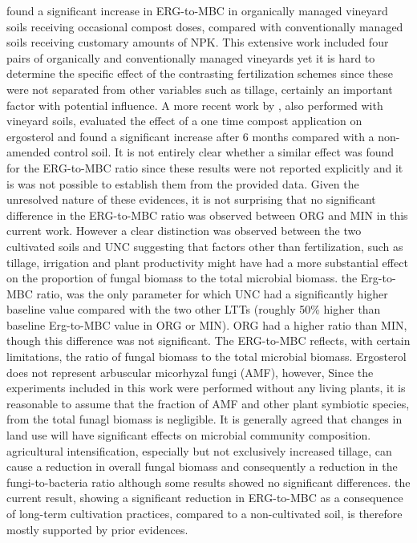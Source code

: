 \documentclass[12pt]{report}
\begin{document}
		\citet{probst2008} found a significant increase in ERG-to-MBC in organically managed vineyard soils receiving occasional compost doses, compared with conventionally managed soils receiving customary amounts of NPK. This extensive work included four pairs of organically and conventionally managed vineyards yet it is hard to determine the specific effect of the contrasting fertilization schemes since these were not separated from other variables such as tillage, certainly an important factor with potential influence. A more recent work by \citet{mackie2015} , also performed with vineyard soils, evaluated the effect of a one time compost application on ergosterol and found a significant increase after 6 months compared with a non-amended control soil. It is not entirely clear whether a similar effect was found for the ERG-to-MBC ratio since these results were not reported explicitly and it is was not possible to establish them from the provided data.
		Given the unresolved nature of these evidences, it is not surprising that no significant difference in the ERG-to-MBC ratio was observed between ORG and MIN in this current work. However a clear distinction was observed between the two cultivated soils and UNC suggesting that factors other than fertilization, such as tillage, irrigation and plant productivity might have had a more substantial effect on the proportion of fungal biomass to the total microbial biomass.
		the Erg-to-MBC ratio, was the only parameter for which UNC had a significantly higher baseline value compared with the two other LTTs (roughly 50\% higher than baseline Erg-to-MBC value in ORG or MIN).
		ORG had a higher ratio than MIN, though this difference was not significant. The ERG-to-MBC reflects, with certain limitations, the ratio of fungal biomass to the total microbial biomass. Ergosterol does not represent arbuscular micorhyzal fungi (AMF), however, Since the experiments included in this work were performed without any living plants, it is reasonable to assume that the fraction of AMF and other plant symbiotic species, from the total funagl biomass is negligible.
		It is generally agreed that changes in land use will have significant effects on microbial community composition\myRed{*}. agricultural intensification, especially but not exclusively increased tillage, can cause a reduction in overall fungal biomass and consequently a reduction in the fungi-to-bacteria ratio\myRed{*} although some results showed no significant differences\myRed{*}.
		the current result, showing a significant reduction in ERG-to-MBC as a consequence of long-term cultivation practices, compared to a non-cultivated soil, is therefore mostly supported by prior evidences.
\end{document}
